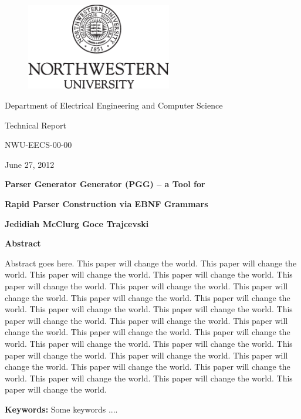 \documentclass{article}
\begin{document}
\vspace{-3.0in}
\begin{figure}
\centering
\includegraphics[width=2.5in]{nwu}
\end{figure}

%
\centerline{\Large Department of Electrical Engineering and Computer Science}
\vspace{0.2in}

\centerline{\Large { Technical Report}}
\vspace{0.05in}
\centerline{\Large { NWU-EECS-00-00}}
\vspace{0.05in}
\centerline{\Large { June 27, 2012}}
\vspace{0.3in}

\centerline{\Large {\bf Parser Generator Generator (PGG) -- a Tool for}}
\centerline{\Large {\bf Rapid Parser Construction via EBNF Grammars}}
\vspace{0.3in}
\centerline{\large {\bf Jedidiah McClurg \hspace {0.2in} Goce Trajcevski}}
\vspace{0.8in}

\centerline{\large {\bf Abstract}}
\vspace{0.15in}
Abstract goes here. 
This paper will change the world.
This paper will change the world.
This paper will change the world.
This paper will change the world.
This paper will change the world.
This paper will change the world.
This paper will change the world.
This paper will change the world.
This paper will change the world.
This paper will change the world.
This paper will change the world.
This paper will change the world.
This paper will change the world.
This paper will change the world.
This paper will change the world.
This paper will change the world.
This paper will change the world.
This paper will change the world.
This paper will change the world.
This paper will change the world.
This paper will change the world.
This paper will change the world.
This paper will change the world.
This paper will change the world.
This paper will change the world.
This paper will change the world.

\vspace{0.5in}
{\bf Keywords:} Some keywords ....
\end{document}
